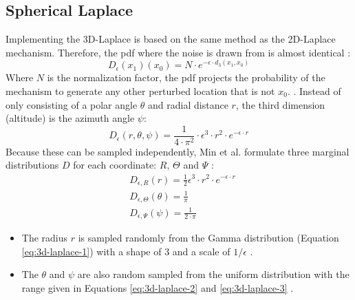 \subsection{Spherical Laplace}
Implementing the 3D-Laplace is based on the same method as the 2D-Laplace mechanism.
Therefore, the \gls{pdf} where the noise is drawn from is almost identical \citep{9646489}:
\begin{equation}
  D_{\epsilon}(x_1)(x_0) = N \cdot e^{-\epsilon \cdot d_3(x_1, x_0)}
  \label{eq:3d-laplace-pdf}
\end{equation}
Where $N$ is the normalization factor, the \gls{pdf} projects the probability of the mechanism to generate any other perturbed location that is not $x_0$. \citep{9646489}.
Instead of only consisting of a polar angle $\theta$ and radial distance $r$, the third dimension (altitude) is the azimuth angle $\psi$:
\begin{equation}
  D_{\epsilon}(r, \theta, \psi) = \frac{1}{4 \cdot \pi^2} \cdot \epsilon^3 \cdot r^2 \cdot e^{-\epsilon \cdot r}
  \label{eq:3d-laplace-with-normalization}
\end{equation}
Because these can be sampled independently, Min et al. formulate three marginal distributions $D$ for each coordinate: $R$, $\Theta$ and $\Psi$ \citep{9646489}:
\begin{subequations}
  \begin{align}
     & D_{\epsilon, R}(r) = \frac{1}{2} \epsilon^3 \cdot r^2 \cdot e^{-\epsilon \cdot r} \label{eq:3d-laplace-1} \\
     & D_{\epsilon, \Theta}(\theta) = \frac{1}{\pi}                                      \label{eq:3d-laplace-2} \\
     & D_{\epsilon, \Psi}(\psi) = \frac{1}{2 \cdot \pi} \label{eq:3d-laplace-3}
  \end{align}
\end{subequations}
\begin{itemize}
  \item The radius $r$ is sampled randomly from the Gamma distribution (Equation \ref{eq:3d-laplace-1}) with a shape of 3 and a scale of $1/\epsilon$ \citep{9646489}.
  \item The $\theta$ and $\psi$ are also random sampled from the uniform distribution with the range given in Equations \ref{eq:3d-laplace-2} and \ref{eq:3d-laplace-3} \citep{9646489}.
\end{itemize}
